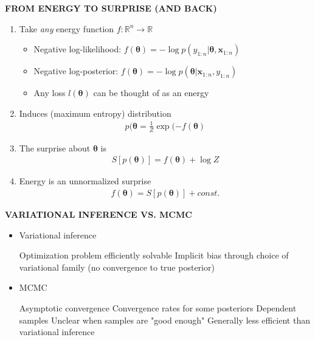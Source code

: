 \begin{whitebox}{\textbf{FROM ENERGY TO SURPRISE (AND BACK)}}
    \begin{enumerate}
        \item Take \textit{any} energy function $f:\mathbb{R}^n\to\mathbb{R}$
        \begin{itemize}
            \item Negative log-likelihood: $f(\bm{\theta})=-\log p(y_{1:n}|\bm{\theta},\bm{x}_{1:n})$
            \item Negative log-posterior: $f(\bm{\theta})=-\log p(\bm{\theta}|\bm{x}_{1:n},y_{1:n})$
            \item Any loss $l(\bm{\theta})$ can be thought of as an energy
        \end{itemize}
        \item Induces (maximum entropy) distribution
        \begin{align*}
            p(\bm{\theta}=\frac{1}{Z}\exp(-f(\bm{\theta})
        \end{align*}
        \item The surprise about $\bm{\theta}$ is 
        \begin{align*}
            S[p(\bm{\theta})]=f(\bm{\theta})+\log Z
        \end{align*}
        \item Energy is an unnormalized surprise
        \begin{align*}
            f(\bm{\theta})=S[p(\bm{\theta})]+const.
        \end{align*}
    \end{enumerate}
\end{whitebox}

\begin{whitebox}{\textbf{VARIATIONAL INFERENCE VS. MCMC}}
    \begin{itemize}
        \item Variational inference
        \begin{itemize}
            \itemPro Optimization problem efficiently solvable
            \itemCon Implicit bias through choice of variational family (no convergence to true posterior)
        \end{itemize}
        \item MCMC
        \begin{itemize}
            \itemPro Asymptotic convergence
            \itemPro Convergence rates for some posteriors
            \itemCon Dependent samples
            \itemCon Unclear when samples are "good enough"
            \itemCon Generally less efficient than variational inference
        \end{itemize}
    \end{itemize}
\end{whitebox}